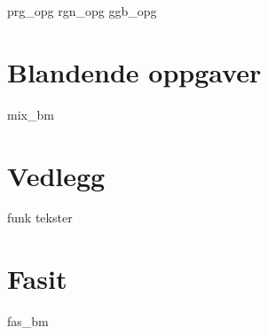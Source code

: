 {prg_opg}
{rgn_opg}	
{ggb_opg}	

\chapter{Blandende oppgaver}
{mix_bm}

\chapter*{Vedlegg} 
\newpage
{}
{funk}
{tekster}

\chapter*{Fasit}
{fas_bm}








